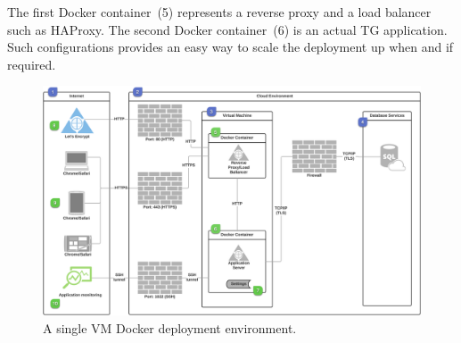 \documentclass[a4paper,12pt,oneside,openright]{memoir}
\begin{document}
	The first Docker container~(5) represents a reverse proxy and a load balancer such as HAProxy.
	The second Docker container~(6) is an actual TG application.
	Such configurations provides an easy way to scale the deployment up when and if required.

	\begin{figure}[h!tbp]
	\centering
	\includegraphics[width=\linewidth]{images/12-more-detailed-security-diagram.png}
	\caption{A single VM Docker deployment environment.}\label{sec:04:fig:1}
	\end{figure}
\end{document}
